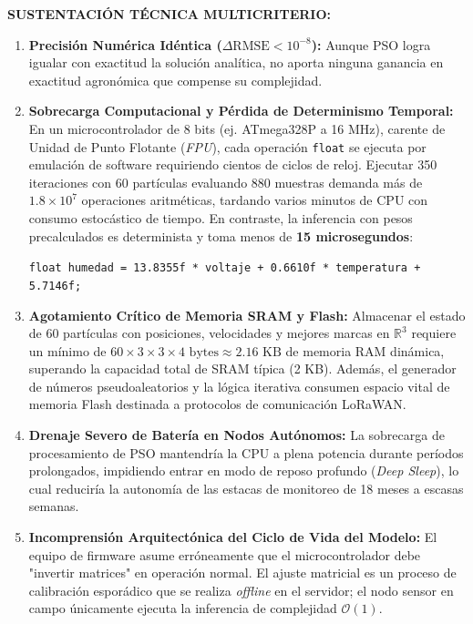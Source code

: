\documentclass[12pt,a4paper]{article}
\newcommand{\R}{\mathbb{R}}
\begin{document}
\begin{p3highlight}
\textbf{SUSTENTACIÓN TÉCNICA MULTICRITERIO:}
\begin{enumerate}[leftmargin=16pt, label=\textbf{\arabic*.}]
  \item \textbf{Precisión Numérica Idéntica ($\Delta \text{RMSE} < 10^{-8}$):} Aunque PSO logra igualar con exactitud la solución analítica, no aporta ninguna ganancia en exactitud agronómica que compense su complejidad.
  \item \textbf{Sobrecarga Computacional y Pérdida de Determinismo Temporal:} 
  En un microcontrolador de 8 bits (ej. ATmega328P a 16 MHz), carente de Unidad de Punto Flotante (\textit{FPU}), cada operación \texttt{float} se ejecuta por emulación de software requiriendo cientos de ciclos de reloj. Ejecutar 350 iteraciones con 60 partículas evaluando 880 muestras demanda más de $1.8 \times 10^7$ operaciones aritméticas, tardando varios minutos de CPU con consumo estocástico de tiempo. En contraste, la inferencia con pesos precalculados es determinista y toma menos de \textbf{15 microsegundos}:
  \begin{center}
    \texttt{float humedad = 13.8355f * voltaje + 0.6610f * temperatura + 5.7146f;}
  \end{center}
  \item \textbf{Agotamiento Crítico de Memoria SRAM y Flash:}
  Almacenar el estado de 60 partículas con posiciones, velocidades y mejores marcas en $\R^3$ requiere un mínimo de $60 \times 3 \times 3 \times 4 \text{ bytes} \approx 2.16 \text{ KB}$ de memoria RAM dinámica, superando la capacidad total de SRAM típica (2 KB). Además, el generador de números pseudoaleatorios y la lógica iterativa consumen espacio vital de memoria Flash destinada a protocolos de comunicación LoRaWAN.
  \item \textbf{Drenaje Severo de Batería en Nodos Autónomos:}
  La sobrecarga de procesamiento de PSO mantendría la CPU a plena potencia durante períodos prolongados, impidiendo entrar en modo de reposo profundo (\textit{Deep Sleep}), lo cual reduciría la autonomía de las estacas de monitoreo de 18 meses a escasas semanas.
  \item \textbf{Incomprensión Arquitectónica del Ciclo de Vida del Modelo:}
  El equipo de firmware asume erróneamente que el microcontrolador debe "invertir matrices" en operación normal. El ajuste matricial es un proceso de calibración esporádico que se realiza \textit{offline} en el servidor; el nodo sensor en campo únicamente ejecuta la inferencia de complejidad $\mathcal{O}(1)$.
\end{enumerate}
\end{p3highlight}
\end{document}
